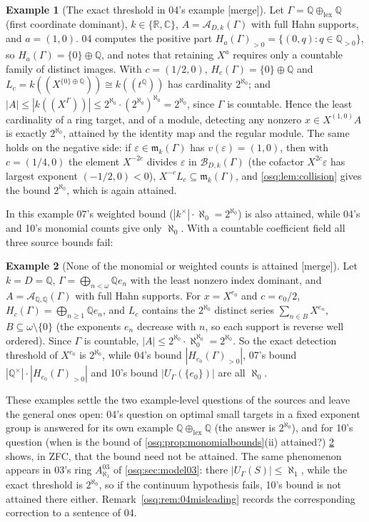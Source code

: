 \documentclass[11pt,letterpaper]{article}
\numberwithin{equation}{section}
\theoremstyle{definition}
\newtheorem{example}[example]{Example}
\theoremstyle{remark}
\theoremstyle{plain}
\newcommand{\Q}{\mathbb Q}
\newcommand{\R}{\mathbb R}
\newcommand{\C}{\mathbb C}
\newcommand{\A}{\mathcal A}          %
\newcommand{\B}{\mathcal B}          %
\newcommand{\mm}{\mathfrak m}        %
\newcommand{\hahn}[2]{#1(\!(X^{#2})\!)}
\newcommand{\merge}{\textup{\textsf{[merge]}}}
\begin{document}
\begin{example}[The exact threshold in 04's example \merge]\label{osq:ex:lexQQ}
Let $\Gamma=\Q\oplus_{\mathrm{lex}}\Q$ (first coordinate dominant), $k\in\{\R,\C\}$,
$A=\A_{D,k}(\Gamma)$ with full Hahn supports, and $a=(1,0)$. 04 computes the
positive part $H_a(\Gamma)_{>0}=\{(0,q):q\in\Q_{>0}\}$, so $H_a(\Gamma)=\{0\}\oplus\Q$, and notes that retaining $X^a$ requires only a countable family of
distinct images. With $c=(1/2,0)$, $H_c(\Gamma)=\{0\}\oplus\Q$ and
$L_c=\hahn k{\{0\}\oplus\Q}\cong k(\!(t^\Q)\!)$ has cardinality $2^{\aleph_0}$; and
$|A|\le|\hahn k\Gamma|\le 2^{\aleph_0}\cdot(2^{\aleph_0})^{\aleph_0}=2^{\aleph_0}$, since
$\Gamma$ is countable. Hence the least cardinality of a ring target, and of a module, detecting
any nonzero $x\in X^{(1,0)}A$ is exactly $2^{\aleph_0}$, attained by the identity map and the regular
module. The same holds on the negative side: if $\varepsilon\in\mm_k(\Gamma)$ has
$v(\varepsilon)=(1,0)$, then with $c=(1/4,0)$ the element $X^{-2c}$ divides $\varepsilon$ in
$\B_{D,k}(\Gamma)$ (the cofactor $X^{2c}\varepsilon$ has largest exponent $(-1/2,0)<0$),
$X^{-c}L_c\subseteq\mm_k(\Gamma)$, and \cref{osq:lem:collision} gives the bound $2^{\aleph_0}$,
which is again attained.
\end{example}

In this example 07's weighted bound ($|k^\times|\cdot\aleph_0=2^{\aleph_0}$) is also attained,
while 04's and 10's monomial counts give only $\aleph_0$. With a countable coefficient field
all three source bounds fail:

\begin{example}[None of the monomial or weighted counts is attained \merge]\label{osq:ex:countablecoeff}
Let $k=D=\Q$, $\Gamma=\bigoplus_{n<\omega}\Q e_n$ with the least nonzero index dominant, and
$A=\A_{\Q,\Q}(\Gamma)$ with full Hahn supports. For $x=X^{e_0}$ and $c=e_0/2$,
$H_c(\Gamma)=\bigoplus_{n\ge1}\Q e_n$, and $L_c$ contains the $2^{\aleph_0}$ distinct series
$\sum_{n\in B}X^{e_n}$, $B\subseteq\omega\setminus\{0\}$ (the exponents $e_n$ decrease with $n$,
so each support is reverse well ordered). Since $\Gamma$ is countable,
$|A|\le2^{\aleph_0}\cdot\aleph_0^{\aleph_0}=2^{\aleph_0}$. So the exact detection threshold of
$X^{e_0}$ is $2^{\aleph_0}$, while 04's bound $|H_{e_0}(\Gamma)_{>0}|$, 07's bound
$|\Q^\times|\cdot|H_{e_0}(\Gamma)_{>0}|$ and 10's bound $|U_\Gamma(\{e_0\})|$ are all
$\aleph_0$.
\end{example}

These examples settle the two example-level questions of the sources and leave the general
ones open: 04's question on optimal small targets in a fixed exponent group is answered for
its own example $\Q\oplus_{\mathrm{lex}}\Q$ (the answer is $2^{\aleph_0}$), and for 10's question
(when is the bound of \cref{osq:prop:monomialbounds}(ii) attained?)
\cref{osq:ex:countablecoeff} shows, in ZFC, that the bound need not be attained. The same phenomenon appears in 03's ring
$A^{03}_{\aleph_1}$ of \cref{osq:sec:model03}: there $|U_\Gamma(S)|\le\aleph_1$, while the
exact threshold is $2^{\aleph_0}$, so if the continuum hypothesis fails, 10's bound is not
attained there either. Remark~\ref{osq:rem:04misleading} records the corresponding correction
to a sentence of 04.
\end{document}
